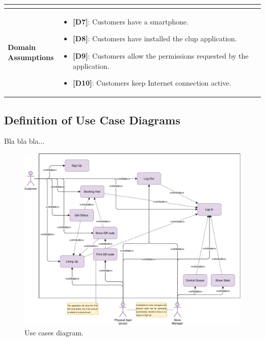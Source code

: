\begin{table}[H]
\begin{tabular}{| m{} | m{} |}
\begin{itemize}
		\end{itemize} \\ 
	\hline
	\shortstack[l]{\textbf{Domain} \\ \textbf{Assumptions}} & 
		\begin{itemize}
			\item {\textbf{[D7]}}: Customers have a smartphone.
			\item {\textbf{[D8]}}: Customers have installed the \gls{clup} application.
			\item {\textbf{[D9]}}: Customers allow the permissions requested by the application.
			\item {\textbf{[D10]}}: Customers keep Internet connection active.
		\end{itemize} \\ 
	\hline
\end{tabular}
\end{table}


\subsection{Definition of Use Case Diagrams}

Bla bla bla...

\begin{figure}[H]
	\centering
	\includegraphics[width=1.0\textwidth]{images/use_cases_diagram.pdf}
	\caption{Use cases diagram.}
\end{figure}

